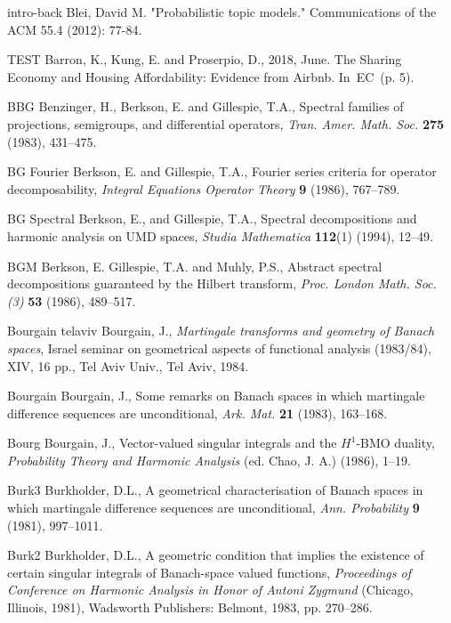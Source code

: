 \clearpage
{}

\begin{thebibliography}{999}

\bibitem
{intro-back}
Blei, David M. "Probabilistic topic models." Communications of the ACM 55.4 (2012): 77-84.

\bibitem
{TEST}
Barron, K., Kung, E. and Proserpio, D., 2018, June. The Sharing Economy and Housing Affordability: Evidence from Airbnb. In EC (p. 5).

\bibitem
{BBG} Benzinger, H., Berkson, E. and Gillespie, T.A.,
Spectral families of projections, semigroups, and differential operators,
\textit{Tran. Amer. Math. Soc.} \textbf{275} (1983), 431--475.

\bibitem
{BG Fourier} Berkson, E. and Gillespie, T.A.,
Fourier series criteria for operator decomposability,
\textit{Integral Equations Operator Theory} \textbf{9} (1986), 767--789.

\bibitem
{BG Spectral} Berkson, E., and Gillespie, T.A.,
Spectral decompositions and harmonic analysis on UMD spaces,
\textit{Studia Mathematica} \textbf{112}(1) (1994), 12--49.

\bibitem
{BGM} Berkson, E. Gillespie, T.A. and Muhly, P.S.,
Abstract spectral decompositions guaranteed by the Hilbert transform,
\textit{Proc. London Math. Soc. (3)} \textbf{53} (1986), 489--517.

\bibitem
{Bourgain telaviv}
Bourgain, J., {\em Martingale transforms and geometry of Banach spaces},
Israel seminar on geometrical aspects of functional analysis
(1983/84), XIV, 16 pp., Tel Aviv Univ., Tel Aviv, 1984.

\bibitem
{Bourgain} Bourgain, J.,
Some remarks on Banach spaces in which martingale difference sequences are
unconditional,
\textit{Ark. Mat.} \textbf{21} (1983), 163--168.

\bibitem
{Bourg} Bourgain, J.,
Vector-valued singular integrals and the $H^1$-BMO duality,
\textit{Probability Theory and Harmonic Analysis} (ed. Chao, J. A.) (1986),
1--19.

\bibitem
{Burk3} Burkholder, D.L.,
A geometrical characterisation of Banach spaces in which martingale difference
sequences are unconditional,
\textit{Ann. Probability} \textbf{9} (1981), 997--1011.

\bibitem
{Burk2} Burkholder, D.L.,
A geometric condition that implies the existence of certain singular integrals
of Banach-space valued functions,
\textit{Proceedings of Conference on Harmonic Analysis in Honor of Antoni
Zygmund} (Chicago, Illinois, 1981), Wadsworth Publishers: Belmont,
1983, pp. 270--286.


\end{thebibliography}
